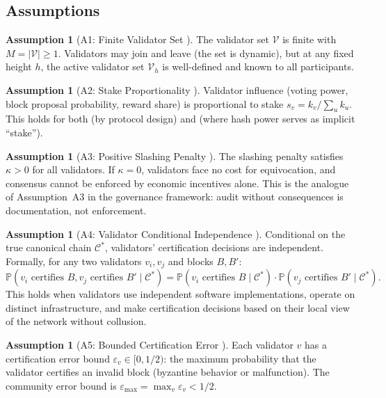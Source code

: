 \documentclass[11pt,a4paper]{article}
\theoremstyle{definition}
\newtheorem{assumption}[theorem]{Assumption}
\newcommand{\Pbb}{\mathbb{P}}
\newcommand{\validatorSet}{\mathcal{V}}
\newcommand{\PoW}{\mathrm{PoW}}
\newcommand{\PoS}{\mathrm{PoS}}
\begin{document}
\subsection{Assumptions}
\begin{assumption}[A1: Finite Validator Set ]
\label{ass:A1}
The validator set $\validatorSet$ is finite with $M = |\validatorSet| \geq 1$. Validators may join and leave (the set is dynamic), but at any fixed height $h$, the active validator set $\validatorSet_h$ is well-defined and known to all participants.
\end{assumption}
\begin{assumption}[A2: Stake Proportionality ]
\label{ass:A2}
Validator influence (voting power, block proposal probability, reward share) is proportional to stake $s_v = k_v / \sum_u k_u$. This holds for both \PoS{} (by protocol design) and \PoW{} (where hash power serves as implicit ``stake'').
\end{assumption}
\begin{assumption}[A3: Positive Slashing Penalty ]
\label{ass:A3}
The slashing penalty satisfies $\kappa > 0$ for all validators. If $\kappa = 0$, validators face no cost for equivocation, and consensus cannot be enforced by economic incentives alone. This is the analogue of Assumption~A3 in the governance framework: audit without consequences is documentation, not enforcement.
\end{assumption}
\begin{assumption}[A4: Validator Conditional Independence ]
\label{ass:A4}
Conditional on the true canonical chain $\mathcal{C}^*$, validators' certification decisions are independent. Formally, for any two validators $v_i, v_j$ and blocks $B, B'$:
\begin{equation}
    \Pbb(v_i \text{ certifies } B, v_j \text{ certifies } B' \mid \mathcal{C}^*) = \Pbb(v_i \text{ certifies } B \mid \mathcal{C}^*) \cdot \Pbb(v_j \text{ certifies } B' \mid \mathcal{C}^*).
    \label{eq:validator_independence}
\end{equation}
This holds when validators use independent software implementations, operate on distinct infrastructure, and make certification decisions based on their local view of the network without collusion.
\end{assumption}
\begin{assumption}[A5: Bounded Certification Error ]
\label{ass:A5}
Each validator $v$ has a certification error bound $\varepsilon_v \in [0, 1/2)$: the maximum probability that the validator certifies an invalid block (byzantine behavior or malfunction). The community error bound is $\varepsilon_{\max} = \max_v \varepsilon_v < 1/2$.
\end{assumption}
\end{document}
